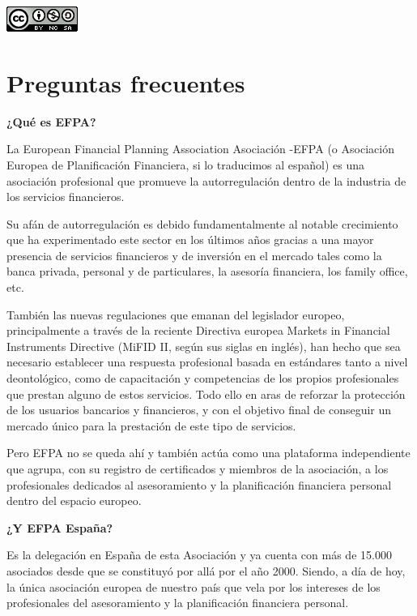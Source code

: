 \documentclass[
  letterpaper,
  DIV=11,
  numbers=noendperiod]{scrreprt}
\begin{document}
\includegraphics{./images/by-nc-sa.png}


\hypertarget{preguntas-frecuentes}{%
\chapter*{Preguntas frecuentes}\label{preguntas-frecuentes}}


\textbf{¿Qué es EFPA?}

La European Financial Planning Association Asociación -EFPA (o
Asociación Europea de Planificación Financiera, si lo traducimos al
español) es una asociación profesional que promueve la autorregulación
dentro de la industria de los servicios financieros.

Su afán de autorregulación es debido fundamentalmente al notable
crecimiento que ha experimentado este sector en los últimos años gracias
a una mayor presencia de servicios financieros y de inversión en el
mercado tales como la banca privada, personal y de particulares, la
asesoría financiera, los family office, etc.

También las nuevas regulaciones que emanan del legislador europeo,
principalmente a través de la reciente Directiva europea Markets in
Financial Instruments Directive (MiFID II, según sus siglas en inglés),
han hecho que sea necesario establecer una respuesta profesional basada
en estándares tanto a nivel deontológico, como de capacitación y
competencias de los propios profesionales que prestan alguno de estos
servicios. Todo ello en aras de reforzar la protección de los usuarios
bancarios y financieros, y con el objetivo final de conseguir un mercado
único para la prestación de este tipo de servicios.

Pero EFPA no se queda ahí y también actúa como una plataforma
independiente que agrupa, con su registro de certificados y miembros de
la asociación, a los profesionales dedicados al asesoramiento y la
planificación financiera personal dentro del espacio europeo.

\textbf{¿Y EFPA España?}

Es la delegación en España de esta Asociación y ya cuenta con más de
15.000 asociados desde que se constituyó por allá por el año 2000.
Siendo, a día de hoy, la única asociación europea de nuestro país que
vela por los intereses de los profesionales del asesoramiento y la
planificación financiera personal.
\end{document}
